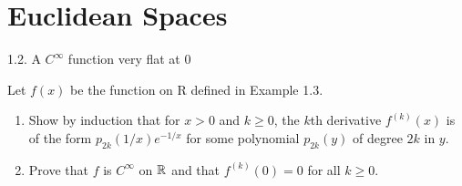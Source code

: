 \section{Euclidean Spaces}

\begin{problem}{1.2. A $C^\infty$ function very flat at $0$}

Let $f(x)$ be the function on R defined in Example 1.3.
\begin{enumerate}[label=(\alph*)]
    \item Show by induction that for $x > 0$ and $k \geq 0$, the $k$th derivative $f^{(k)}(x)$ is of the form
    $p_{2k}(1/x)e^{-1/x}$ for some polynomial $p_{2k}(y)$ of degree $2k$ in $y$.
    \item Prove that $f$ is $C^\infty$ on $\mathbb{R}$ and that $f^{(k)}(0)=0$ for all $k \geq 0$.
\end{enumerate}
\end{problem}

